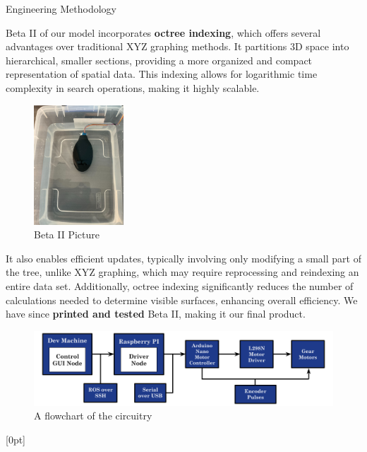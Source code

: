 \documentclass[final, 16pt]{beamer}
\newlength{\colwidth}
\newlength{\twocolwidth}
\begin{document}
\begin{frame}[t]
\begin{columns}[t]
\begin{column}{\twocolwidth}
\begin{block}{Engineering Methodology}
\begin{minipage}[t]{0.48\linewidth}
      Beta II of our model incorporates \textbf{octree indexing}, which offers several advantages over traditional XYZ graphing methods. It partitions 3D space into hierarchical, smaller sections, providing a more organized and compact representation of spatial data. This indexing allows for logarithmic time complexity in search operations, making it highly scalable. 
      
      \begin{figure}
        \centering
        \includegraphics[scale=0.15, height=0.30\textwidth, width=0.30\textwidth]{img/Beta_II.jpg}
        \caption{Beta II Picture}
        \label{fig:beta-ii}
      \end{figure}

      It also enables efficient updates, typically involving only modifying a small part of the tree, unlike XYZ graphing, which may require reprocessing and reindexing an entire data set. Additionally, octree indexing significantly reduces the number of calculations needed to determine visible surfaces, enhancing overall efficiency. We have since \textbf{printed and tested} Beta II, making it our final product.

      \vspace{1cm}

      \begin{figure}[H]
        \centering
        \includegraphics[width=0.95\linewidth]{img/Circuit_Flow_Chart.png}
        \caption{A flowchart of the circuitry}
        \label{fig:circuit-flow-chart}
      \end{figure}
    \end{minipage}

    [0pt]

    \vspace{0.5cm}
    

\end{block}
\end{column}
\end{columns}
\end{frame}
\end{document}

